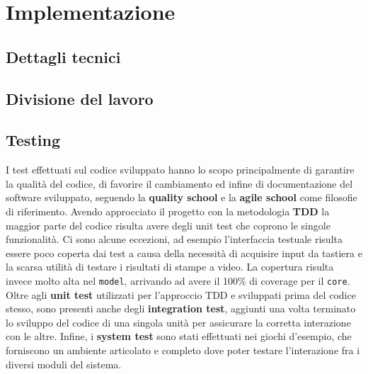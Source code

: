 \section{Implementazione}






\subsection{Dettagli tecnici} %





\subsection{Divisione del lavoro}
\subsection{Testing}
I test effettuati sul codice sviluppato hanno lo scopo principalmente di garantire la qualità del codice, di favorire il cambiamento ed infine di documentazione del software sviluppato, seguendo la \textbf{quality school} e la \textbf{agile school} come filosofie di riferimento.
%
Avendo approcciato il progetto con la metodologia \textbf{TDD} la maggior parte del codice risulta avere degli unit test che coprono le singole funzionalità.
%
Ci sono alcune eccezioni, ad esempio l'interfaccia testuale risulta essere poco coperta dai test a causa della necessità di acquisire input da tastiera e la scarsa utilità di testare i risultati di stampe a video.
%
La copertura risulta invece molto alta nel \texttt{model}, arrivando ad avere il 100\% di coverage per il \texttt{core}.
%
Oltre agli \textbf{unit test} utilizzati per l'approccio TDD e sviluppati prima del codice stesso, sono presenti anche degli \textbf{integration test}, aggiunti una volta terminato lo sviluppo del codice di una singola unità per assicurare la corretta interazione con le altre.
%
Infine, i \textbf{system test} sono stati effettuati nei giochi d'esempio, che forniscono un ambiente articolato e completo dove poter testare l'interazione fra i diversi moduli del sistema.
%

